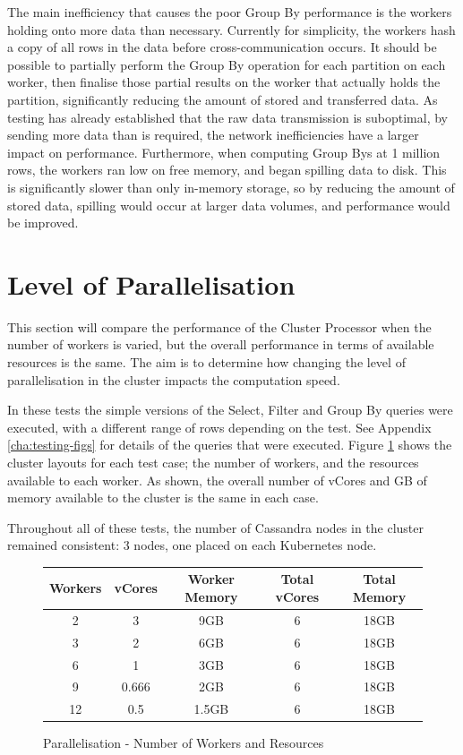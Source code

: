 The main inefficiency that causes the poor Group By performance is the workers holding onto more data than necessary. Currently for simplicity, the workers hash a copy of all rows in the data before cross-communication occurs. It should be possible to partially perform the Group By operation for each partition on each worker, then finalise those partial results on the worker that actually holds the partition, significantly reducing the amount of stored and transferred data. As testing has already established that the raw data transmission is suboptimal, by sending more data than is required, the network inefficiencies have a larger impact on performance. Furthermore, when computing Group Bys at 1 million rows, the workers ran low on free memory, and began spilling data to disk. This is significantly slower than only in-memory storage, so by reducing the amount of stored data, spilling would occur at larger data volumes, and performance would be improved.

\section{Level of Parallelisation}\label{sec:parallelisation-test}
This section will compare the performance of the Cluster Processor when the number of workers is varied, but the overall performance in terms of available resources is the same. The aim is to determine how changing the level of parallelisation in the cluster impacts the computation speed. 

In these tests the simple versions of the Select, Filter and Group By queries were executed, with a different range of rows depending on the test. See Appendix \ref{cha:testing-figs} for details of the queries that were executed. Figure \ref{fig:parallelisation-test-workers} shows the cluster layouts for each test case; the number of workers, and the resources available to each worker. As shown, the overall number of vCores and GB of memory available to the cluster is the same in each case.

Throughout all of these tests, the number of Cassandra nodes in the cluster remained consistent: 3 nodes, one placed on each Kubernetes node.

\begin{figure}[ht]
	\centering
	\begin{tabular}{| c | c | c | c | c |}
		\hline
		\textbf{Workers} & \textbf{vCores} & \textbf{Worker Memory} & \textbf{Total vCores} & \textbf{Total Memory} \\ \hline
		2 & 3 & 9GB & 6 & 18GB \\ \hline
		3 & 2 & 6GB & 6 & 18GB \\ \hline
		6 & 1 & 3GB & 6 & 18GB \\ \hline
		9 & 0.666 & 2GB & 6 & 18GB \\ \hline
		12 & 0.5 & 1.5GB & 6 & 18GB \\ \hline
	\end{tabular}
	\caption{Parallelisation - Number of Workers and Resources}
	\label{fig:parallelisation-test-workers}
\end{figure}

